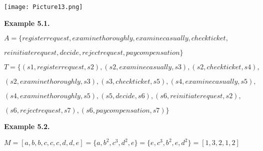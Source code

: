 \documentclass[a4paper]{article}
\begin{document}
\begin{center}
    \texttt{[image: Picture13.png]}\\
\end{center}

\vspace{1 cm}

\textbf{Example 5.1.} 
\par
$A = \{register request , examine thoroughly , examine casually , check ticket ,$\par
$reinitiate request , decide , reject request , pay compensation\}$
\par\null\par
$T =\{(s1,register request , s2) ,(s2 , examine casually , s3),(s2, check ticket ,s4),$\par
$(s2,examine thoroughly ,s3),(s3,check ticket,s5),(s4 , examine casually,s5),$\par
$(s4,examine thoroughly ,s5),(s5,decide,s6),(s6, reinitiate request ,s2),$\par
$(s6,reject request,s7),(s6, pay compensation, s7)\}$

\vspace{1 cm}

\textbf{Example 5.2.} 
\par
$M = [a,b,b,c,c,c,d,d,e] = \{a,b^2,c^3,d^2,e\}  = \{e,c^3,b^2,e,d^2\} = [1,3,2,1,2]$
\end{document}
